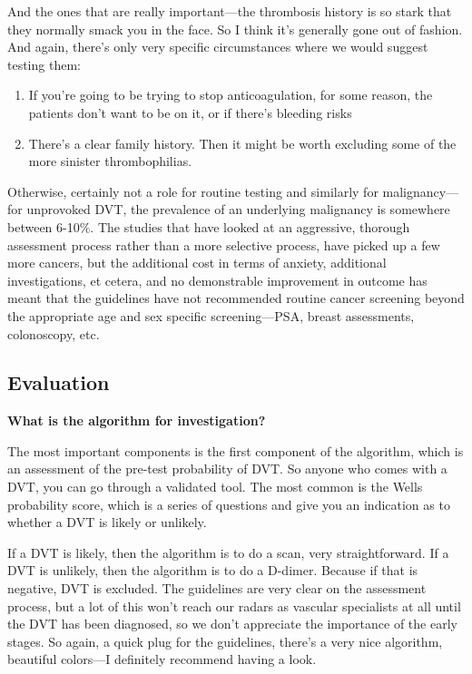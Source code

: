 \documentclass[
]{book}
\begin{document}
And the ones that are really important---the thrombosis history is so
stark that they normally smack you in the face. So I think it's
generally gone out of fashion. And again, there's only very specific
circumstances where we would suggest testing them:

\begin{enumerate}
\def\labelenumi{\arabic{enumi}.}
\item
  If you're going to be trying to stop anticoagulation, for some
  reason, the patients don't want to be on it, or if there's bleeding
  risks
\item
  There's a clear family history. Then it might be worth excluding
  some of the more sinister thrombophilias.
\end{enumerate}

Otherwise, certainly not a role for routine testing and similarly for
malignancy---for unprovoked DVT, the prevalence of an underlying
malignancy is somewhere between 6-10\%. The studies that have looked at
an aggressive, thorough assessment process rather than a more selective
process, have picked up a few more cancers, but the additional cost in
terms of anxiety, additional investigations, et cetera, and no
demonstrable improvement in outcome has meant that the guidelines have
not recommended routine cancer screening beyond the appropriate age and
sex specific screening---PSA, breast assessments, colonoscopy, etc.

\hypertarget{evaluation-18}{%
\subsection{Evaluation}\label{evaluation-18}}

\textbf{What is the algorithm for investigation?}

The most important components is the first component of the algorithm,
which is an assessment of the pre-test probability of DVT. So anyone who
comes with a DVT, you can go through a validated tool. The most common
is the Wells probability score, which is a series of questions and give
you an indication as to whether a DVT is likely or unlikely.

If a DVT is likely, then the algorithm is to do a scan, very
straightforward. If a DVT is unlikely, then the algorithm is to do a
D-dimer. Because if that is negative, DVT is excluded. The guidelines
are very clear on the assessment process, but a lot of this won't reach
our radars as vascular specialists at all until the DVT has been
diagnosed, so we don't appreciate the importance of the early stages. So
again, a quick plug for the guidelines, there's a very nice algorithm,
beautiful colors---I definitely recommend having a look.
\end{document}
